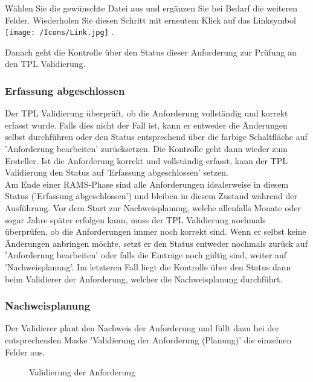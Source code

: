 Wählen Sie die gewünschte Datei aus und ergänzen Sie bei Bedarf die weiteren Felder. Wiederholen Sie diesen Schritt mit erneutem Klick auf das Linksymbol \texttt{[image: /Icons/Link.jpg]} .

\vspace{\baselineskip}

Danach geht die Kontrolle über den Status dieser Anforderung zur Prüfung an den TPL Validierung. 

\subsubsection{Erfassung abgeschlossen}

Der TPL Validierung überprüft, ob die Anforderung vollständig und korrekt erfasst wurde. Falls dies nicht der Fall ist, kann er entweder die Änderungen selbst durchführen oder den Status entsprechend über die farbige Schaltfläche auf 'Anforderung bearbeiten' zurücksetzen. Die Kontrolle geht dann wieder zum Ersteller. Ist die Anforderung korrekt und vollständig erfasst, kann der TPL Validierung den Status auf 'Erfassung abgeschlossen' setzen. \\

Am Ende einer RAMS-Phase sind alle Anforderungen idealerweise in diesem Status ('Erfassung abgeschlossen') und bleiben in diesem Zustand während der Ausführung. Vor dem Start zur Nachweisplanung, welche allenfalls Monate oder sogar Jahre später erfolgen kann, muss der TPL Validierung nochmals überprüfen, ob die Anforderungen immer noch korrekt sind. Wenn er selbst keine Änderungen anbringen möchte, setzt er den Status entweder nochmals zurück auf 'Anforderung bearbeiten' oder falls die Einträge noch gültig sind, weiter auf 'Nachweisplanung'. Im letzteren Fall liegt die Kontrolle über den Status dann beim Validierer der Anforderung, welcher die Nachweisplanung durchführt. 

\subsubsection{Nachweisplanung}
\label{bkm:Ref2018071811}

Der Validierer plant den Nachweis der Anforderung und füllt dazu bei der entsprechenden Maske 'Validierung der Anforderung (Planung)'  die einzelnen Felder aus. 

\begin{figure}[H]
\caption{Validierung der Anforderung}
\end{figure}

